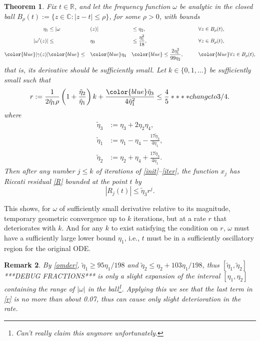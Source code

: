 \documentclass[10pt]{article}
\newcommand{\be}{\begin{equation}}
\newcommand{\ee}{\end{equation}}
\newcommand{\C}{\mathbb{C}}
\newcommand{\R}{\mathbb{R}}
\newtheorem{thm}{Theorem}
\newtheorem{rmk}[thm]{Remark}
\newcommand{\om}{\omega}
\newcommand{\g}{\gamma}
\newcommand{\te}{\tilde\eta}
\newcommand{\Fruzsi}[1]{{\color{blue}#1}}
\begin{document}
\begin{thm}\label{TR}
  Fix $t\in\R$, and let the frequency function $\om$ be analytic
  in the closed ball $B_\rho(t) := \{z\in\C : |z-t| \le \rho\}$,
  for some $\rho>0$, with bounds
    \begin{alignat}{4}
        \eta_1 &\leq |\om&&(z)| &&\leq \eta_2, \qquad &&\forall z\in B_\rho(t), \label{ommag} \\
        |\om'(z)| &\leq &&\eta_3 &&\leq \frac{\eta_1^2}{18}, &&\forall z\in B_\rho(t), \label{omder} \\
        \Fruzsi{|\g(z)|} &\Fruzsi{\leq} &&\Fruzsi{\eta_4} &&\Fruzsi{\leq \frac{2\eta_1^2}{99\eta_2},} \qquad &&\Fruzsi{\forall z\in B_\rho(t),} \label{gammaupper}
  \end{alignat}
  that is, its derivative should be sufficiently small.
  Let $k\in\{0,1,\dots\}$ be sufficiently small such that
  \be
    r := \frac{1}{2\te_1 \rho} \left(1 + \frac{\te_2}{\te_1}\right) k + \frac{\Fruzsi{\te_3}}{4\te_1^2} \leq \frac{4}{5}  **** change to 3/4.
  \label{r}
  \ee
  where
  \begin{align}
    \te_3 &:= \eta_3 + 2\eta_2\eta_4, \label{eta3}
    \\
    \te_1 &:= \eta_1 - \eta_4 - \frac{17 \te_3}{4 \eta_1},  \label{eta1}
    \\ 
    \te_2 &:= \eta_2 + \eta_4 + \frac{17 \te_3}{4 \eta_1}. \label{eta2}
  \end{align}
  Then after any number $j\le k$ of iterations of \cref{init}--\cref{iter},
  the function $x_j$ has Riccati residual \cref{R} bounded at the point $t$ by
  \Fruzsi{
  \be
  |R_j(t)| \le \te_3 r^j.
  \label{Rjbnd}
  \ee
  }
\end{thm}
This shows, for $\om$ of sufficiently small derivative
relative to its magnitude,
temporary geometric convergence up to $k$ iterations,
but at a rate $r$ that deteriorates with $k$.
And for any $k$ to exist satisfying the condition on $r$, $\om$ must have
a sufficiently large lower bound $\eta_1$, i.e., $t$
must be in a sufficiently oscillatory region for the original ODE.

\begin{rmk}\label{slight}
    By \cref{omder}, \Fruzsi{$\te_1 \ge 95\eta_1/198$} and \Fruzsi{$\te_2 \le \eta_2 + 103\eta_1/198$},
  thus $[\te_1,\te_2]$ ***DEBUG FRACTIONS*** is only a slight
  expansion of the interval $[\eta_1,\eta_2]$ containing the range of
    $|\om|$ in the ball\footnote{\Fruzsi{Can't really claim this anymore unfortunately.}}.
  Applying this we see that the last term in \cref{r}
    is no more than \Fruzsi{about 0.07}, thus can cause only slight deterioration in the rate.
\end{rmk}
\end{document}
